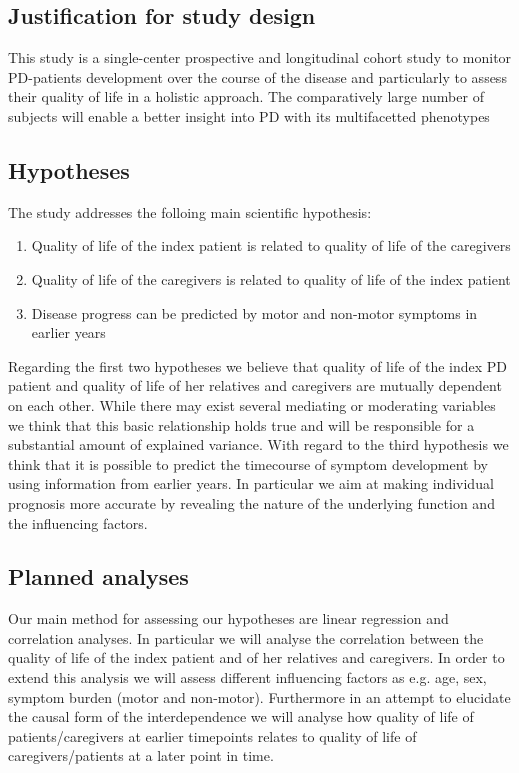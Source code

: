 \subsection{Justification for study design}
This study is a single-center prospective and longitudinal cohort study to monitor \ac{PD}-patients development over the course of the disease and particularly to assess their quality of life in a holistic approach. The comparatively large number of subjects will enable a better insight into \ac{PD} with its multifacetted phenotypes

\subsection{Hypotheses}
\label{sec:hypotheses}
The study addresses the folloing main scientific hypothesis:
\begin{enumerate}
  \item Quality of life of the index patient is related to quality of life of the caregivers
  \item Quality of life of the caregivers is related to quality of life of the index patient
  \item Disease progress can be predicted by motor and non-motor symptoms in earlier years
\end{enumerate}
Regarding the first two hypotheses we believe that quality of life of the index \ac{PD} patient and quality of life of her relatives and caregivers are mutually dependent on each other. While there may exist several mediating or moderating variables we think that this basic relationship holds true and will be responsible for a substantial amount of explained variance. With regard to the third hypothesis we think that it is possible to predict the timecourse of symptom development by using information from earlier years. In particular we aim at making individual prognosis more accurate by revealing the nature of the underlying function and the influencing factors.

\subsection{Planned analyses}
Our main method for assessing our hypotheses are linear regression and correlation analyses. In particular we will analyse the correlation between the quality of life of the index patient and of her relatives and caregivers. In order to extend this analysis we will assess different influencing factors as e.g. age, sex, symptom burden (motor and non-motor). Furthermore in an attempt to elucidate the causal form of the interdependence we will analyse how quality of life of patients/caregivers at earlier timepoints relates to quality of life of caregivers/patients at a later point in time.

